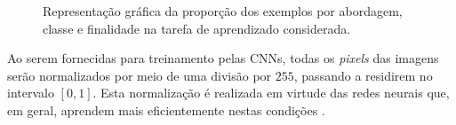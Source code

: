 \begin{figure}[h!]
	\centering
	\caption{Representação gráfica da proporção dos exemplos por abordagem, classe e finalidade na tarefa de aprendizado considerada.}
	\hfill
	\label{fig:divisao-dados}
\end{figure}

Ao serem fornecidas para treinamento pelas CNNs, todas os \emph{pixels} das imagens serão normalizados por meio de uma divisão por $255$, passando a residirem no intervalo $[0,1]$. Esta normalização é realizada em virtude das redes neurais que, em geral, aprendem mais eficientemente nestas condições \cite{chollet}.
